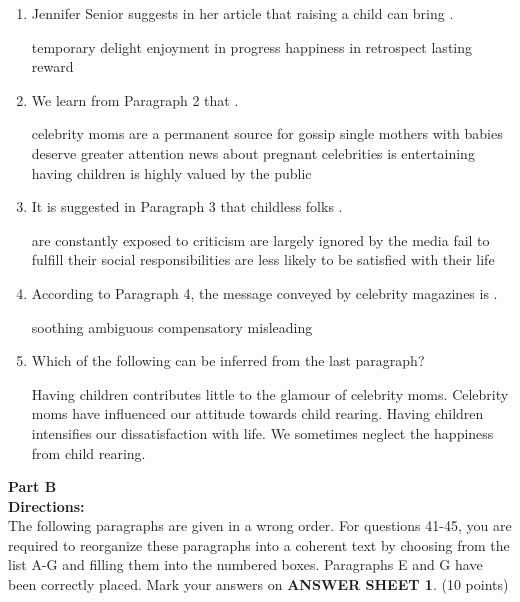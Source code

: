 \begin{enumerate}[resume]
	\item
 Jennifer Senior suggests in her article that
raising a child can bring \lineread.


\fourchoices
{temporary delight}
{enjoyment in progress}
{happiness in retrospect}
{lasting reward}



\item 
We learn from Paragraph 2 that \lineread.


\fourchoices
{celebrity moms are a permanent source for gossip}
{single mothers with babies deserve greater attention}
{news about pregnant celebrities is entertaining}
{having children is highly valued by the public}




\item
 It is suggested in Paragraph 3 that childless folks \lineread.


\fourchoices
{are constantly exposed to criticism}
{are largely ignored by the media}
{fail to fulfill their social responsibilities}
{are less likely to be satisfied with their life}




\item
According to Paragraph 4, the message conveyed by celebrity
magazines is \lineread.


\fourchoices
{soothing}
{ambiguous}
{compensatory}
{misleading}




\item
Which of the following can be inferred from the last
paragraph?


\fourchoices
{Having children contributes little to the glamour of celebrity moms.}
{Celebrity moms have influenced our attitude towards child rearing.}
{Having children intensifies our dissatisfaction with life.}
{We sometimes neglect the happiness from child rearing.}



	
\end{enumerate}


\newpage
\noindent
\textbf{Part B}\\
\textbf{Directions:}\\
The following paragraphs are given in a wrong order. For
	questions 41-45, you are required to reorganize these paragraphs into a
	coherent text by choosing from the list A-G and filling them into the
	numbered boxes. Paragraphs E and G have been correctly placed. Mark your
	answers on \textbf{ANSWER SHEET 1}. (10 points)


